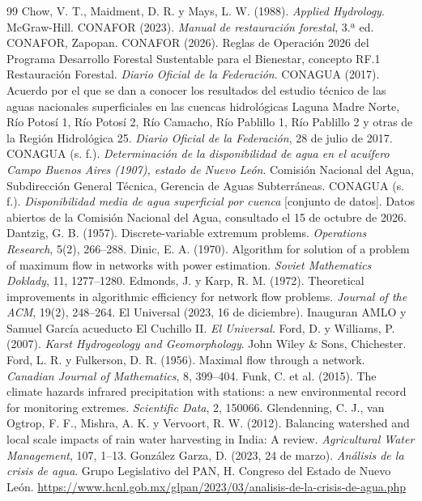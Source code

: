 \documentclass[11pt,letterpaper]{article}
\begin{document}
\begin{thebibliography}{99}
 Chow, V. T., Maidment, D. R. y Mays, L. W. (1988). \emph{Applied Hydrology}. McGraw-Hill.
 CONAFOR (2023). \emph{Manual de restauración forestal}, 3.ª ed. CONAFOR, Zapopan.
 CONAFOR (2026). Reglas de Operación 2026 del Programa Desarrollo Forestal Sustentable para el Bienestar, concepto RF.1 Restauración Forestal. \emph{Diario Oficial de la Federación}.
 CONAGUA (2017). Acuerdo por el que se dan a conocer los resultados del estudio técnico de las aguas nacionales superficiales en las cuencas hidrológicas Laguna Madre Norte, Río Potosí 1, Río Potosí 2, Río Camacho, Río Pablillo 1, Río Pablillo 2 y otras de la Región Hidrológica 25. \emph{Diario Oficial de la Federación}, 28 de julio de 2017.
 CONAGUA (s. f.). \emph{Determinación de la disponibilidad de agua en el acuífero Campo Buenos Aires (1907), estado de Nuevo León}. Comisión Nacional del Agua, Subdirección General Técnica, Gerencia de Aguas Subterráneas.
 CONAGUA (s. f.). \emph{Disponibilidad media de agua superficial por cuenca} [conjunto de datos]. Datos abiertos de la Comisión Nacional del Agua, consultado el 15 de octubre de 2026.
 Dantzig, G. B. (1957). Discrete-variable extremum problems. \emph{Operations Research}, 5(2), 266–288.
 Dinic, E. A. (1970). Algorithm for solution of a problem of maximum flow in networks with power estimation. \emph{Soviet Mathematics Doklady}, 11, 1277–1280.
 Edmonds, J. y Karp, R. M. (1972). Theoretical improvements in algorithmic efficiency for network flow problems. \emph{Journal of the ACM}, 19(2), 248–264.
 El Universal (2023, 16 de diciembre). Inauguran AMLO y Samuel García acueducto El Cuchillo II. \emph{El Universal}.
 Ford, D. y Williams, P. (2007). \emph{Karst Hydrogeology and Geomorphology}. John Wiley \& Sons, Chichester.
 Ford, L. R. y Fulkerson, D. R. (1956). Maximal flow through a network. \emph{Canadian Journal of Mathematics}, 8, 399–404.
 Funk, C. et al. (2015). The climate hazards infrared precipitation with stations: a new environmental record for monitoring extremes. \emph{Scientific Data}, 2, 150066.
 Glendenning, C. J., van Ogtrop, F. F., Mishra, A. K. y Vervoort, R. W. (2012). Balancing watershed and local scale impacts of rain water harvesting in India: A review. \emph{Agricultural Water Management}, 107, 1–13.
 González Garza, D. (2023, 24 de marzo). \emph{Análisis de la crisis de agua}. Grupo Legislativo del PAN, H. Congreso del Estado de Nuevo León. \url{https://www.hcnl.gob.mx/glpan/2023/03/analisis-de-la-crisis-de-agua.php}

\end{thebibliography}
\end{document}
